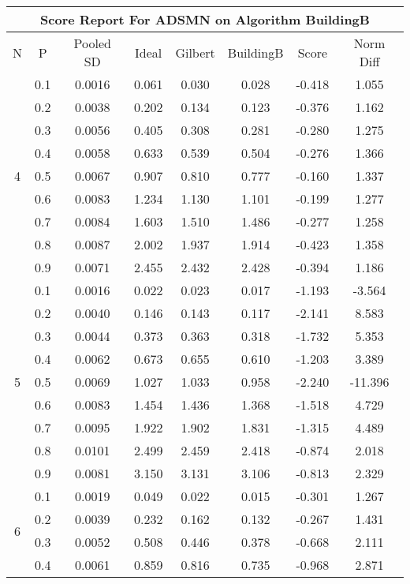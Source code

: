 \documentclass[11pt,a4paper]{report}
\begin{document}
\begin{longtable}{ | c | c || c | c | c | c | c | c | }
\hline
\multicolumn{8}{|c|}{ Score Report For ADSMN on Algorithm BuildingB} \\
\hline
N & P & Pooled SD &  Ideal &  Gilbert & BuildingB  & Score & Norm Diff \\
 \hline
 \hline
 \endhead
\multirow{9}{*}{4} & 0.1 & 0.0016 & 0.061 & 0.030 & 0.028 & -0.418 & 1.055 \\
 & 0.2 & 0.0038 & 0.202 & 0.134 & 0.123 & -0.376 & 1.162 \\
 & 0.3 & 0.0056 & 0.405 & 0.308 & 0.281 & -0.280 & 1.275 \\
 & 0.4 & 0.0058 & 0.633 & 0.539 & 0.504 & -0.276 & 1.366 \\
 & 0.5 & 0.0067 & 0.907 & 0.810 & 0.777 & -0.160 & 1.337 \\
 & 0.6 & 0.0083 & 1.234 & 1.130 & 1.101 & -0.199 & 1.277 \\
 & 0.7 & 0.0084 & 1.603 & 1.510 & 1.486 & -0.277 & 1.258 \\
 & 0.8 & 0.0087 & 2.002 & 1.937 & 1.914 & -0.423 & 1.358 \\
 & 0.9 & 0.0071 & 2.455 & 2.432 & 2.428 & -0.394 & 1.186 \\
 \hline
\multirow{9}{*}{5} & 0.1 & 0.0016 & 0.022 & 0.023 & 0.017 & -1.193 & -3.564 \\
 & 0.2 & 0.0040 & 0.146 & 0.143 & 0.117 & -2.141 & 8.583 \\
 & 0.3 & 0.0044 & 0.373 & 0.363 & 0.318 & -1.732 & 5.353 \\
 & 0.4 & 0.0062 & 0.673 & 0.655 & 0.610 & -1.203 & 3.389 \\
 & 0.5 & 0.0069 & 1.027 & 1.033 & 0.958 & -2.240 & -11.396 \\
 & 0.6 & 0.0083 & 1.454 & 1.436 & 1.368 & -1.518 & 4.729 \\
 & 0.7 & 0.0095 & 1.922 & 1.902 & 1.831 & -1.315 & 4.489 \\
 & 0.8 & 0.0101 & 2.499 & 2.459 & 2.418 & -0.874 & 2.018 \\
 & 0.9 & 0.0081 & 3.150 & 3.131 & 3.106 & -0.813 & 2.329 \\
 \hline
\multirow{9}{*}{6} & 0.1 & 0.0019 & 0.049 & 0.022 & 0.015 & -0.301 & 1.267 \\
 & 0.2 & 0.0039 & 0.232 & 0.162 & 0.132 & -0.267 & 1.431 \\
 & 0.3 & 0.0052 & 0.508 & 0.446 & 0.378 & -0.668 & 2.111 \\
 & 0.4 & 0.0061 & 0.859 & 0.816 & 0.735 & -0.968 & 2.871 \\

\end{longtable}
\end{document}

